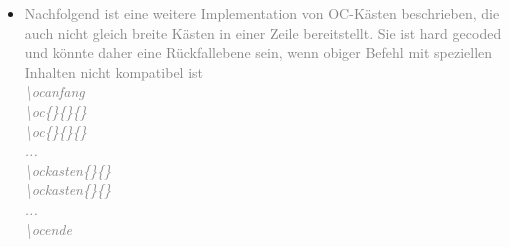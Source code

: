 \documentclass[./main.tex]{subfiles}
\begin{document}
\begin{itemize}
    \item \textcolor{gray}{Nachfolgend ist eine weitere Implementation von OC-K\"asten beschrieben, die auch nicht gleich breite K\"asten in einer Zeile bereitstellt. Sie ist hard gecoded und k\"onnte daher eine R\"uckfallebene sein, wenn obiger Befehl mit speziellen Inhalten nicht kompatibel ist \hypertarget{oc}{} \hypertarget{ocanfang}{} \hypertarget{ochilf}{} \hypertarget{ockasten}{}\\
    \textit{\textbackslash ocanfang \\\textbackslash oc\{\}\{\}\{\} \\\textbackslash oc\{\}\{\}\{\} \\...\\\textbackslash ockasten\{\}\{\}\\\textbackslash ockasten\{\}\{\}\\...\\\textbackslash ocende}\\
}
\end{itemize}
\end{document}
